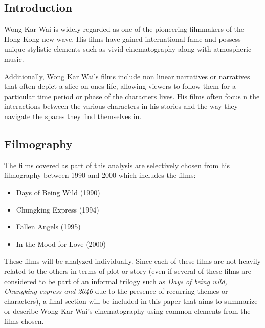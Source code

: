 \begin{multicols}{2}
\tableofcontents
\section{Introduction}
Wong Kar Wai is widely regarded as one of the pioneering filmmakers of the Hong Kong new wave. His films have gained international fame and possess unique stylistic elements such as vivid cinematography along with atmospheric music.

Additionally, Wong Kar Wai's films include non linear narratives or narratives that often depict a slice on ones life, allowing viewers to follow them for a particular time period or phase of the characters lives. His films often focus n the interactions between the various characters in his stories and the way they navigate the spaces they find themselves in.

\subsection{Filmography}
The films covered as part of this analysis are selectively chosen from his filmography between 1990 and 2000 which includes the films:

\begin{itemize}
    \item Days of Being Wild (1990)
    \item Chungking Express (1994)
    \item Fallen Angels (1995)
    \item In the Mood for Love (2000)
\end{itemize}

These films will be analyzed individually. Since each of these films are not heavily related to the others in terms of plot or story (even if several of these films are considered to be part of an informal trilogy such as \emph{Days of being wild, Chungking express and 2046} due to the presence of recurring themes or characters), a final section will be included in this paper that aims to summarize or describe Wong Kar Wai's cinematography using common elements from the films chosen. 

\end{multicols}